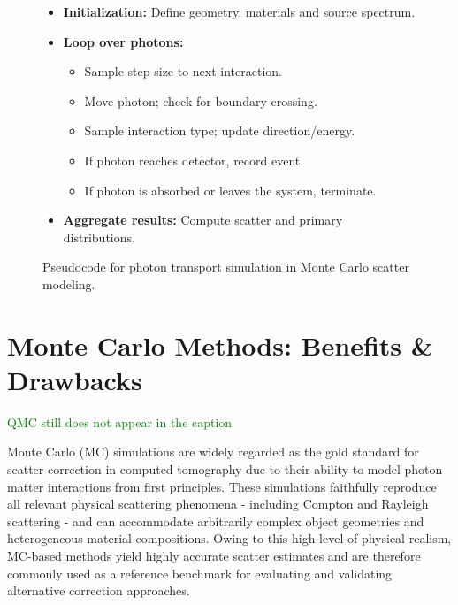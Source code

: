 \begin{figure}[!h]
\centering
\begin{tcolorbox}[colback=white!95!gray, colframe=black!60, width=0.9 \textwidth, title=Monte Carlo Photon Transport Algorithm, fonttitle=\bfseries]
\begin{itemize}[leftmargin=1.5em]
    \item \textbf{Initialization:} Define geometry, materials and source
    spectrum.
    \item \textbf{Loop over photons:}
    \begin{itemize}
        \item Sample step size to next interaction.
        \item Move photon; check for boundary crossing.
        \item Sample interaction type; update direction/energy.
        \item If photon reaches detector, record event.
        \item If photon is absorbed or leaves the system, terminate.
    \end{itemize}
    \item \textbf{Aggregate results:} Compute scatter and primary distributions.
\end{itemize}
\end{tcolorbox}
\caption{Pseudocode for photon transport simulation in Monte Carlo scatter modeling.}
\label{fig:photon-transport-pseudocode}
\end{figure}


\section{Monte Carlo Methods: Benefits \& Drawbacks}
\textcolor{green}{QMC still does not appear in the caption}

Monte Carlo (MC) simulations are widely regarded as the gold standard for
scatter correction in computed tomography due to their ability to model
photon-matter interactions from first principles. These simulations faithfully
reproduce all relevant physical scattering phenomena - including Compton and
Rayleigh scattering - and can accommodate arbitrarily complex object geometries
and heterogeneous material compositions. Owing to this high level of physical
realism, MC-based methods yield highly accurate scatter estimates and are
therefore commonly used as a reference benchmark for evaluating and validating
alternative correction approaches.

